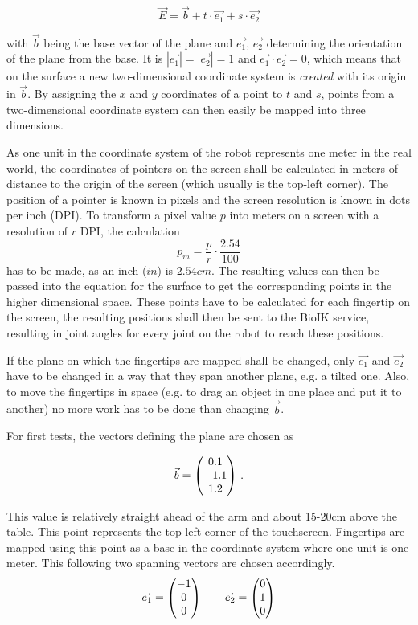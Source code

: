 \begin{equation*}
\vec{E} = \vec{b} + t\cdot \vec{e_1} + s \cdot \vec{e_2}
\end{equation*}

with $\vec{b}$ being the base vector of the plane and $\vec{e_1}$, $\vec{e_2}$ determining the orientation of the plane from the base. It is $|\vec{e_1}| = |\vec{e_2}| = 1$ and $\vec{e_1} \cdot \vec{e_2} = 0$, which means that on the surface a new two-dimensional coordinate system is \textit{created} with its origin in $\vec{b}$. By assigning the $x$ and $y$ coordinates of a point to $t$ and $s$, points from a two-dimensional coordinate system can then easily be mapped into three dimensions.

As one unit in the coordinate system of the robot represents one meter in the real world, the coordinates of pointers on the screen shall be calculated in meters of distance to the origin of the screen (which usually is the top-left corner). The position of a pointer is known in pixels and the screen resolution is known in dots per inch (DPI). To transform a pixel value $p$ into meters on a screen with a resolution of $r$ DPI, the calculation
\begin{equation}
\label{eq:conc:dftm:world}
p_m = \frac{p}{r} \cdot \frac{2.54}{100}
\end{equation}
has to be made, as an inch ($in$) is $2.54cm$. The resulting values can then be passed into the equation for the surface to get the corresponding points in the higher dimensional space. These points have to be calculated for each fingertip on the screen, the resulting positions shall then be sent to the BioIK service, resulting in joint angles for every joint on the robot to reach these positions.

If the plane on which the fingertips are mapped shall be changed, only $\vec{e_1}$ and $\vec{e_2}$ have to be changed in a way that they span another plane, e.g. a tilted one.  Also, to move the fingertips in space (e.g. to drag an object in one place and put it to another) no more work has to be done than changing $\vec{b}$. 

For first tests, the vectors defining the plane are chosen as 

\begin{equation*}
\vec{b} = \left( \begin{matrix} 0.1 \\ -1.1 \\ 1.2 \end{matrix} \right) \, .
\end{equation*}

	
	This value is relatively straight ahead of the arm and about 15-20cm above the table. This point represents the top-left corner of the touchscreen. Fingertips are mapped using this point as a base in the coordinate system where one unit is one meter. This following two spanning vectors are chosen accordingly.
	\begin{equation*}
	 \vec{e_1} = \left( \begin{matrix} -1 \\ 0 \\ 0 \end{matrix} \right) \qquad
	\vec{e_2} = \left( \begin{matrix} 0 \\ 1 \\ 0 \end{matrix} \right)
	\end{equation*}
	
